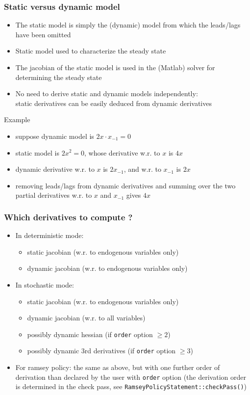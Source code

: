 \documentclass{beamer}
\begin{document}
\begin{frame}
  \frametitle{Static versus dynamic model}
  \begin{itemize}
  \item The static model is simply the (dynamic) model from which the leads/lags have been omitted
  \item Static model used to characterize the steady state
  \item The jacobian of the static model is used in the (Matlab) solver for determining the steady state
  \item No need to derive static and dynamic models independently: \\
    static derivatives can be easily deduced from dynamic derivatives
  \end{itemize}
  \begin{block}{Example}
    \begin{itemize}
    \item suppose dynamic model is $2x \cdot x_{-1} = 0$
    \item static model is $2x^2 = 0$, whose derivative w.r. to $x$ is $4x$
    \item dynamic derivative w.r. to $x$ is $2x_{-1}$, and w.r. to $x_{-1}$ is $2x$
    \item removing leads/lags from dynamic derivatives and summing over the two partial derivatives w.r. to $x$ and $x_{-1}$ gives $4x$
    \end{itemize}
  \end{block}
\end{frame}

\begin{frame}
  \frametitle{Which derivatives to compute ?}
  \begin{itemize}
  \item In deterministic mode:
    \begin{itemize}
    \item static jacobian (w.r. to endogenous variables only)
    \item dynamic jacobian (w.r. to endogenous variables only)
    \end{itemize}
  \item In stochastic mode:
    \begin{itemize}
    \item static jacobian (w.r. to endogenous variables only)
    \item dynamic jacobian (w.r. to all variables)
    \item possibly dynamic hessian (if \texttt{order} option $\geq 2$)
    \item possibly dynamic 3rd derivatives (if \texttt{order} option $\geq 3$)
    \end{itemize}
  \item For ramsey policy: the same as above, but with one further order of derivation than declared by the user with \texttt{order} option (the derivation order is determined in the check pass, see \texttt{RamseyPolicyStatement::checkPass()})
  \end{itemize}
\end{frame}
\end{document}
